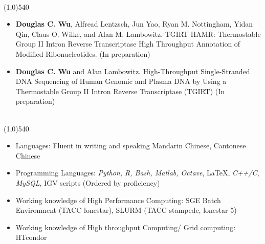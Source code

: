 \documentclass[dvips,11pt]{article}
\begin{document}
\bigskip
{} \vspace{-1.5mm}
\\\noindent
\line(1,0){540}\\
 \vspace{-6mm}
\begin{itemize}
	\setlength{\itemsep}{0pt}
	\item {\bf Douglas C. Wu}, Alfread Lentzsch, Jun Yao, Ryan M. Nottingham, Yidan Qin, Claus O. Wilke, and Alan M. Lambowitz. TGIRT-HAMR: Thermostable Group II Intron Reverse Transcriptase High Throughput Annotation of Modified Ribonucleotides. (In preparation)
	\item {\bf Douglas C. Wu} and Alan Lambowitz. High-Throughput Single-Stranded DNA Sequencing of Human Genomic and Plasma DNA by Using a Thermostable Group II Intron Reverse Transcriptase (TGIRT) (In preparation)
\end{itemize}



 \vspace{-2mm}
\\\noindent
\vspace{-7mm}
\line(1,0){540}\\

\begin{itemize} \itemsep 1pt \parskip 0pt \parsep 0pt
	\setlength{\itemsep}{0pt}
	\item	Languages: Fluent in writing and speaking Mandarin Chinese, Cantonese Chinese
	\item	Programming Languages: {\it Python, R, Bash, Matlab, Octave}, \LaTeX, {\it C++/C},  {\it MySQL}, IGV scripts (Ordered by proficiency)
	\item Working knowledge of High Performance Computing: SGE Batch Environment (TACC lonestar), SLURM (TACC stampede, lonestar 5)
	\item Working knowledge of High throughput Computing/ Grid computing: HTcondor
\end{itemize}
\newpage
\end{document}
